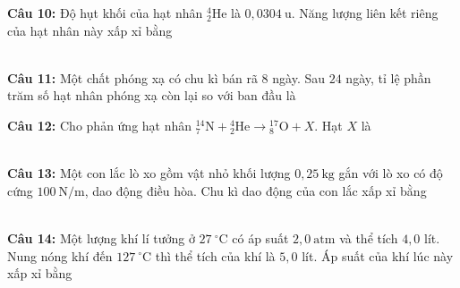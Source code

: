\documentclass[12pt,a4paper]{article}
\begin{document}
\begin{minipage}{\textwidth}
\noindent \textbf{Câu 10:} Độ hụt khối của hạt nhân $^{4}_{2}\text{He}$ là $0{,}0304\ \text{u}$. Năng lượng liên kết riêng của hạt nhân này xấp xỉ bằng\\
\noindent{}\\
\noindent{}
\end{minipage}


\begin{minipage}{\textwidth}
\noindent \textbf{Câu 11:} Một chất phóng xạ có chu kì bán rã $8$ ngày. Sau $24$ ngày, tỉ lệ phần trăm số hạt nhân phóng xạ còn lại so với ban đầu là\\
\noindent{}
\end{minipage}


\begin{minipage}{\textwidth}
\noindent \textbf{Câu 12:} Cho phản ứng hạt nhân $^{14}_{7}\text{N} + {}^{4}_{2}\text{He} \to {}^{17}_{8}\text{O} + X$. Hạt $X$ là\\
\noindent{}\\
\noindent{}
\end{minipage}


\begin{minipage}{\textwidth}
\noindent \textbf{Câu 13:} Một con lắc lò xo gồm vật nhỏ khối lượng $0{,}25\ \text{kg}$ gắn với lò xo có độ cứng $100\ \text{N/m}$, dao động điều hòa. Chu kì dao động của con lắc xấp xỉ bằng\\
\noindent{}\\
\noindent{}
\end{minipage}


\begin{minipage}{\textwidth}
\noindent \textbf{Câu 14:} Một lượng khí lí tưởng ở $27\ ^{\circ}\text{C}$ có áp suất $2{,}0\ \text{atm}$ và thể tích $4{,}0$ lít. Nung nóng khí đến $127\ ^{\circ}\text{C}$ thì thể tích của khí là $5{,}0$ lít. Áp suất của khí lúc này xấp xỉ bằng\\
\noindent{}\\
\noindent{}
\end{minipage}
\end{document}
